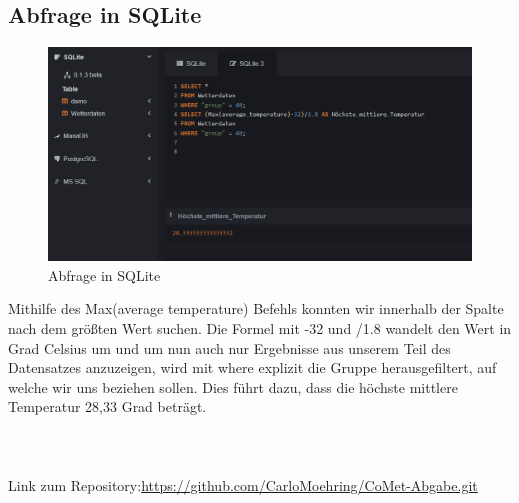 \documentclass{article}
\begin{document}
\subsection{Abfrage in SQLite}
\begin{figure}[H]
    \centering
    \includegraphics[scale=0.6]{SQLite 2.png}
    \caption{Abfrage in SQLite}
\end{figure}
Mithilfe des Max(average temperature) Befehls konnten wir innerhalb der Spalte nach dem größten Wert suchen. Die Formel mit -32 und /1.8 wandelt den Wert in Grad Celsius um und um nun auch nur Ergebnisse aus unserem Teil des Datensatzes anzuzeigen, wird mit where explizit die Gruppe herausgefiltert, auf welche wir uns beziehen sollen. Dies führt dazu, dass die höchste mittlere Temperatur 28,33 Grad beträgt.\\ \\ \\ \\
Link zum Repository:\url{https://github.com/CarloMoehring/CoMet-Abgabe.git}
\newpage


\end{document}
